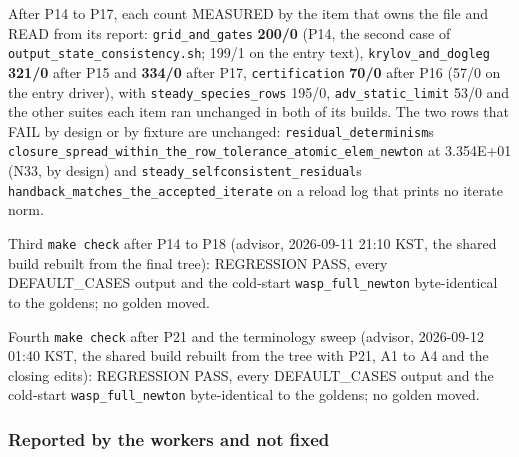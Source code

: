 \documentclass[english,a4paper]{my_memo}
\begin{document}
After P14 to P17, each count MEASURED by the item that owns the file and READ
from its report: \texttt{grid\_and\_gates} \textbf{200/0} (P14, the second case of
\texttt{output\_state\_consistency.sh}; 199/1 on the entry text),
\texttt{krylov\_and\_dogleg} \textbf{321/0} after P15 and \textbf{334/0} after P17,
\texttt{certification} \textbf{70/0} after P16 (57/0 on the entry driver), with
\texttt{steady\_species\_rows} 195/0, \texttt{adv\_static\_limit} 53/0 and the other suites each
item ran unchanged in both of its builds. The two rows that FAIL by design or by
fixture are unchanged: \texttt{residual\_determinism}\textquotesingle s
\texttt{closure\_spread\_within\_the\_row\_tolerance\_atomic\_elem\_newton} at 3.354E+01 (N33,
by design) and \texttt{steady\_selfconsistent\_residual}\textquotesingle s
\texttt{handback\_matches\_the\_accepted\_iterate} on a reload log that prints no iterate
norm.

Third \texttt{make\ check} after P14 to P18 (advisor, 2026-09-11 21:10 KST, the shared build rebuilt from the final tree): REGRESSION PASS, every DEFAULT\_CASES output and the cold-start \texttt{wasp\_full\_newton} byte-identical to the goldens; no golden moved.

Fourth \texttt{make\ check} after P21 and the terminology sweep (advisor, 2026-09-12 01:40 KST, the shared build rebuilt from the tree with P21, A1 to A4 and the closing edits): REGRESSION PASS, every DEFAULT\_CASES output and the cold-start \texttt{wasp\_full\_newton} byte-identical to the goldens; no golden moved.

\subsubsection{Reported by the workers and not fixed}\label{reported-by-the-workers-and-not-fixed}
\end{document}

